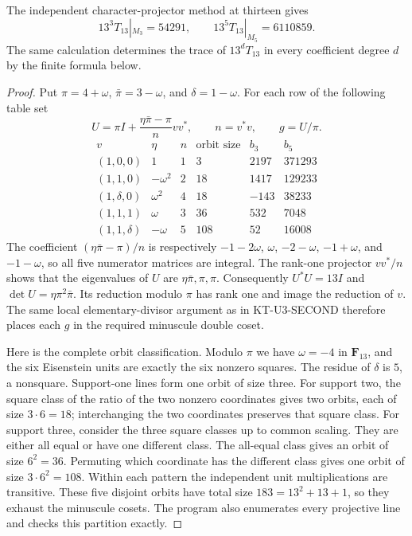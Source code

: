 \begin{theorem}[KT-U3-SECOND13]
The independent character-projector method at thirteen gives
\[
          13^3T_{13}|_{M_3}=54291,
          \qquad 13^5T_{13}|_{M_5}=6110859.
\]
The same calculation determines the trace of $13^dT_{13}$ in every
coefficient degree $d$ by the finite formula below.
\end{theorem}
\begin{proof}
Put $\pi=4+\omega$, $\bar\pi=3-\omega$, and $\delta=1-\omega$.
For each row of the following table set
\[
      U=\pi I+\frac{\eta\bar\pi-\pi}{n}vv^*,
      \qquad n=v^*v,\qquad g=U/\pi.
\]
\[
\begin{array}{c|c|r|r|r|r}
v&\eta&n&\text{orbit size}&b_3&b_5\\\hline
(1,0,0)&1&1&3&2197&371293\\
(1,1,0)&-\omega^2&2&18&1417&129233\\
(1,\delta,0)&\omega^2&4&18&-143&38233\\
(1,1,1)&\omega&3&36&532&7048\\
(1,1,\delta)&-\omega&5&108&52&16008
\end{array}
\]
The coefficient $(\eta\bar\pi-\pi)/n$ is respectively
$-1-2\omega$, $\omega$, $-2-\omega$, $-1+\omega$, and
$-1-\omega$, so all five numerator matrices are integral.
The rank-one projector $vv^*/n$ shows that the eigenvalues of
$U$ are $\eta\bar\pi,\pi,\pi$. Consequently
$U^*U=13I$ and $\det U=\eta\pi^2\bar\pi$.
Its reduction modulo $\pi$ has rank one and image the reduction
of $v$. The same local elementary-divisor argument as in
KT-U3-SECOND therefore places each $g$ in the required minuscule
double coset.

Here is the complete orbit classification. Modulo $\pi$ we have
$\omega=-4$ in $\mathbf F_{13}$, and the six Eisenstein units
are exactly the six nonzero squares. The residue of $\delta$ is
$5$, a nonsquare. Support-one lines form one orbit of size three.
For support two, the square class of the ratio of the two nonzero
coordinates gives two orbits, each of size $3\cdot6=18$;
interchanging the two coordinates preserves that square class.
For support three, consider the three square classes up to common
scaling. They are either all equal or have one different class.
The all-equal class gives an orbit of size $6^2=36$.
Permuting which coordinate has the different class gives one orbit
of size $3\cdot6^2=108$. Within each pattern the independent unit
multiplications are transitive. These five disjoint orbits have
total size $183=13^2+13+1$, so they exhaust the minuscule cosets.
The program also enumerates every projective line and checks this
partition exactly.


\end{proof}
